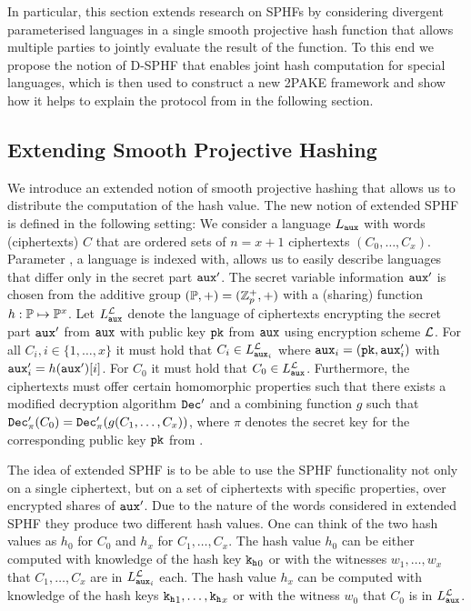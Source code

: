 In particular, this section extends research on \aclp{SPHF} by considering divergent parameterised languages in a single smooth projective hash function that allows multiple parties to jointly evaluate the result of the function. 
To this end we propose the notion of \ac{D-SPHF} that enables joint hash computation for special languages, which is then used to construct a new \ac{2PAKE} framework and show how it helps to explain the protocol from \citet{Katz2012a} in the following section.


\subsection{Extending Smooth Projective Hashing}\label{sec:sphff}
We introduce an extended notion of smooth projective hashing that allows us to distribute the computation of the hash value.
The new notion of extended \ac{SPHF} is defined in the following setting:
We consider a language $L_\mathtt{aux}$ with words (ciphertexts) $C$ that are ordered sets of $n=x+1$ ciphertexts $(C_0,\dots,C_x)$.
Parameter \aux, a language is indexed with, allows us to easily describe languages that differ only in the secret part $\mathtt{aux}'$.
The secret variable information $\mathtt{aux}'$ is chosen from the additive group $(\mathbb{P},+)=(\mathbb{Z}_p^{+},+)$ with a (sharing) function $h:\mathbb{P}\mapsto\mathbb{P}^x$.
Let $L^\mathcal{L}_\mathtt{aux}$ denote the language of ciphertexts encrypting the secret part $\mathtt{aux}'$ from $\mathtt{aux}$ with public key $\mathtt{pk}$ from $\mathtt{aux}$ using encryption scheme $\mathcal{L}$.
For all $C_i, i\in\{1,\dots,x\}$ it must hold that $C_i\in L^\mathcal{L}_{\mathtt{aux}_i}$ where $\mathtt{aux}_i=(\mathtt{pk},\mathtt{aux}'_i)$ with $\mathtt{aux}'_i=h(\mathtt{aux}')[i]$.
For $C_0$ it must hold that $C_0\in L^\mathcal{L}_{\mathtt{aux}}$.
Furthermore, the ciphertexts must offer certain homomorphic properties such that there exists a modified decryption algorithm $\mathtt{Dec}'$ and a combining function $g$ such that $\mathtt{Dec}'_{\pi}(C_0)=\mathtt{Dec}'_{\pi}(g(C_1,\dots,C_x))$, where $\pi$ denotes the secret key for the corresponding public key $\mathtt{pk}$ from \crs.

The idea of extended \ac{SPHF} is to be able to use the \ac{SPHF} functionality not only on a single ciphertext, but on a set of ciphertexts with specific properties, \ie over encrypted shares of $\mathtt{aux}'$.
Due to the nature of the words considered in extended \ac{SPHF} they produce two different hash values.
One can think of the two hash values as $h_0$ for $C_0$ and  $h_x$ for $C_1,\dots,C_x$.
The hash value $h_0$ can be either computed with knowledge of the hash key $\mathtt{k_h}_0$ or with the witnesses $w_1,\dots,w_x$ that $C_1,\dots,C_x$ are in $L^\mathcal{L}_{\mathtt{aux}_i}$ each.
The hash value $h_x$ can be computed with knowledge of the hash keys $\mathtt{k_h}_1,\dots,\mathtt{k_h}_x$ or with the witness $w_0$ that $C_0$ is in $L^\mathcal{L}_{\mathtt{aux}}$.

